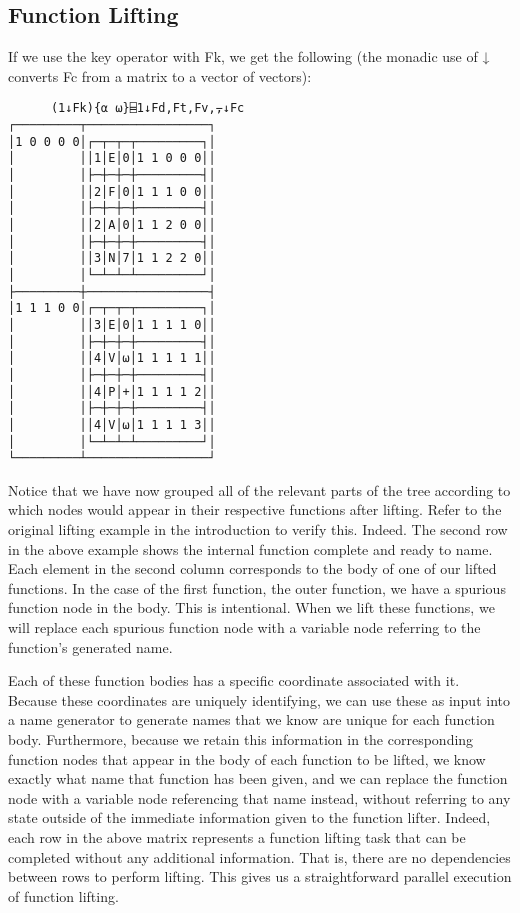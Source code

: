 \documentclass[numbers,preprint]{sigplanconf}
\begin{document}
\subsection{Function Lifting}

If we use the key operator with Fk, we get the following (the monadic use of ↓ converts Fc from a 
matrix to a vector of vectors):

\begin{verbatim}
      (1↓Fk){⍺ ⍵}⌸1↓Fd,Ft,Fv,⍪↓Fc
┌─────────┬─────────────────┐
│1 0 0 0 0│┌─┬─┬─┬─────────┐│
│         ││1│E│0│1 1 0 0 0││
│         │├─┼─┼─┼─────────┤│
│         ││2│F│0│1 1 1 0 0││
│         │├─┼─┼─┼─────────┤│
│         ││2│A│0│1 1 2 0 0││
│         │├─┼─┼─┼─────────┤│
│         ││3│N│7│1 1 2 2 0││
│         │└─┴─┴─┴─────────┘│
├─────────┼─────────────────┤
│1 1 1 0 0│┌─┬─┬─┬─────────┐│
│         ││3│E│0│1 1 1 1 0││
│         │├─┼─┼─┼─────────┤│
│         ││4│V│⍵│1 1 1 1 1││
│         │├─┼─┼─┼─────────┤│
│         ││4│P│+│1 1 1 1 2││
│         │├─┼─┼─┼─────────┤│
│         ││4│V│⍵│1 1 1 1 3││
│         │└─┴─┴─┴─────────┘│
└─────────┴─────────────────┘
\end{verbatim}

Notice that we have now grouped all of the relevant parts of the tree according to which nodes would 
appear in their respective functions after lifting. Refer to the original lifting example in the 
introduction to verify this. Indeed. The second row in the above example shows the internal function 
complete and ready to name. Each element in the second column corresponds to the body of one of our 
lifted functions. In the case of the first function, the outer function, we have a spurious function node 
in the body. This is intentional. When we lift these functions, we will replace each spurious function 
node with a variable node referring to the function’s generated name. 

Each of these function bodies has a specific coordinate associated with it. Because these coordinates 
are uniquely identifying, we can use these as input into a name generator to generate names that we 
know are unique for each function body. Furthermore, because we retain this information in the 
corresponding function nodes that appear in the body of each function to be lifted, we know exactly what 
name that function has been given, and we can replace the function node with a variable node referencing 
that name instead, without referring to any state outside of the immediate information given to the 
function lifter. Indeed, each row in the above matrix represents a function lifting task that can be 
completed without any additional information. That is, there are no dependencies between rows to perform 
lifting. This gives us a straightforward parallel execution of function lifting. 
\end{document}
